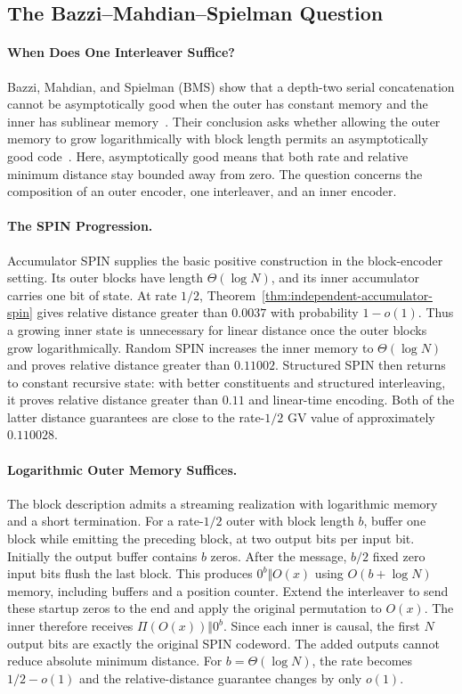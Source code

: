 \subsection{The Bazzi--Mahdian--Spielman Question}
\label{sec:bms-question}

\paragraph{When Does One Interleaver Suffice?}
Bazzi, Mahdian, and Spielman (BMS) show that a depth-two serial concatenation
cannot be asymptotically good when the outer has constant memory and the
inner has sublinear memory~\cite[Sec.~III-A]{bms09}. Their conclusion asks
whether allowing the outer memory to grow logarithmically with block length
permits an asymptotically good code~\cite[Sec.~IV]{bms09}.
Here, asymptotically good means that both rate and relative minimum
distance stay bounded away from zero. The question concerns the
composition of an outer encoder, one interleaver, and an inner encoder.

\paragraph{The SPIN Progression.}
Accumulator SPIN supplies the basic positive construction in the
block-encoder setting. Its outer blocks have length $\Theta(\log N)$,
and its inner accumulator carries one bit of state. At rate $1/2$,
Theorem~\ref{thm:independent-accumulator-spin} gives relative distance
greater than $0.0037$ with probability $1-o(1)$. Thus a growing inner
state is unnecessary for linear distance once the outer blocks grow
logarithmically. Random SPIN increases the inner memory to
$\Theta(\log N)$ and proves relative distance greater than $0.11002$.
Structured SPIN then returns to constant recursive state: with better
constituents and structured interleaving, it proves relative distance
greater than $0.11$ and linear-time encoding. Both of the latter distance
guarantees are close to the rate-$1/2$ GV value of approximately $0.110028$.

\paragraph{Logarithmic Outer Memory Suffices.}
The block description admits a streaming realization with logarithmic
memory and a short termination. For a rate-$1/2$ outer with block length
$b$, buffer one block while emitting the preceding block, at two output
bits per input bit. Initially the output buffer contains $b$ zeros.
After the message, $b/2$ fixed zero input bits flush the last block.
This produces $0^b\Vert O(x)$ using $O(b+\log N)$ memory, including
buffers and a position counter. Extend the interleaver to send these
startup zeros to the end and apply the original permutation to $O(x)$.
The inner therefore receives $\Pi(O(x))\Vert0^b$. Since each inner is
causal, the first $N$ output bits are exactly the original SPIN codeword.
The added outputs cannot reduce absolute minimum distance. For
$b=\Theta(\log N)$, the rate becomes $1/2-o(1)$ and the relative-distance
guarantee changes by only $o(1)$.

